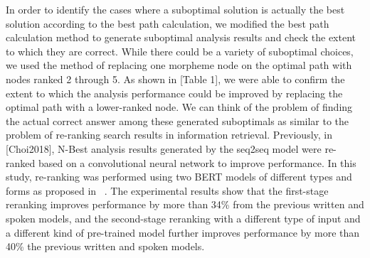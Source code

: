 \documentclass[AMS,STIX2COL]{WileyNJD-v2}
\begin{document}

    In order to identify the cases where a suboptimal solution is actually the best solution according to the best path calculation, we modified the best path calculation method to generate suboptimal analysis results and check the extent to which they are correct.
    While there could be a variety of suboptimal choices, we used the method of replacing one morpheme node on the optimal path with nodes ranked 2 through 5.
    As shown in [Table 1], we were able to confirm the extent to which the analysis performance could be improved by replacing the optimal path with a lower-ranked node.
    We can think of the problem of finding the actual correct answer among these generated suboptimals as similar to the problem of re-ranking search results in information retrieval.
    Previously, in [Choi2018], N-Best analysis results generated by the seq2seq model were re-ranked based on a convolutional neural network to improve performance.
    In this study, re-ranking was performed using two BERT models of different types and forms as proposed in ~\cite{Nogueira2019}.
    The experimental results show that the first-stage reranking improves performance by more than 34\% from the previous written and spoken models, and the second-stage reranking with a different type of input and a different kind of pre-trained model further improves performance by more than 40\% the previous written and spoken models.
\end{document}
